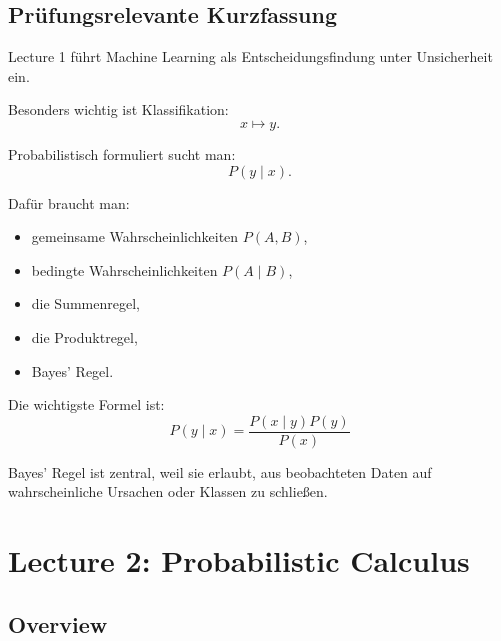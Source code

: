 \documentclass[11pt,a4paper]{scrartcl}
\begin{document}
\subsection{Prüfungsrelevante Kurzfassung}

\begin{answerbox}
    Lecture 1 führt Machine Learning als Entscheidungsfindung unter Unsicherheit
    ein.

    Besonders wichtig ist Klassifikation:
    \[
        x \longmapsto y.
    \]

    Probabilistisch formuliert sucht man:
    \[
        P(y \mid x).
    \]

    Dafür braucht man:
    \begin{itemize}
        \item gemeinsame Wahrscheinlichkeiten \(P(A,B)\),
        \item bedingte Wahrscheinlichkeiten \(P(A \mid B)\),
        \item die Summenregel,
        \item die Produktregel,
        \item Bayes' Regel.
    \end{itemize}

    Die wichtigste Formel ist:
    \[
        \boxed{
            P(y \mid x)
            =
            \frac{P(x \mid y)P(y)}{P(x)}
        }
    \]

    Bayes' Regel ist zentral, weil sie erlaubt, aus beobachteten Daten auf
    wahrscheinliche Ursachen oder Klassen zu schließen.
\end{answerbox}

\section{Lecture 2: Probabilistic Calculus}

\subsection{Overview}
\end{document}
